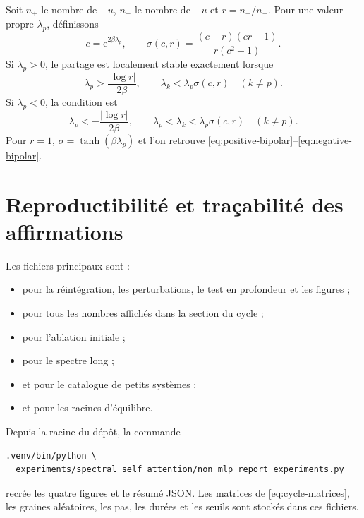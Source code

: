 \documentclass[11pt,a4paper]{article}
\theoremstyle{definition}
\newcommand{\e}{\mathrm e}
\begin{document}
Soit $n_+$ le nombre de $+u$, $n_-$ le nombre de $-u$ et $r=n_+/n_-$. Pour une valeur
propre $\lambda_p$, définissons
\[
 c=\e^{2\beta\lambda_p},\qquad
 \sigma(c,r)=\frac{(c-r)(cr-1)}{r(c^2-1)}.
\]
Si $\lambda_p>0$, le partage est localement stable exactement lorsque
\[
 \lambda_p>\frac{|\log r|}{2\beta},
 \qquad \lambda_k<\lambda_p\sigma(c,r)\quad(k\neq p).
\]
Si $\lambda_p<0$, la condition est
\[
 \lambda_p<-\frac{|\log r|}{2\beta},
 \qquad \lambda_p<\lambda_k<\lambda_p\sigma(c,r)\quad(k\neq p).
\]
Pour $r=1$, $\sigma=\tanh(\beta\lambda_p)$ et l'on retrouve
\eqref{eq:positive-bipolar}--\eqref{eq:negative-bipolar}.

\section{Reproductibilité et traçabilité des affirmations}
\label{app:reproducibility}

Les fichiers principaux sont :
\begingroup
\small
\raggedright
\begin{itemize}
  \item {}
  pour la réintégration, les perturbations, le test en profondeur et les figures ;
  \item {}
  pour tous les nombres affichés dans la section du cycle ;
  \item {}
  pour l'ablation initiale ;
  \item {}
  pour le spectre long ;
  \item {}
  et  pour le catalogue de petits systèmes ;
  \item {}
  et  pour les racines d'équilibre.
\end{itemize}
\endgroup

Depuis la racine du dépôt, la commande
\begin{verbatim}
.venv/bin/python \
  experiments/spectral_self_attention/non_mlp_report_experiments.py
\end{verbatim}
recrée les quatre figures et le résumé JSON. Les matrices de
\eqref{eq:cycle-matrices}, les graines aléatoires, les pas, les durées et les seuils sont
stockés dans ces fichiers.
\end{document}
